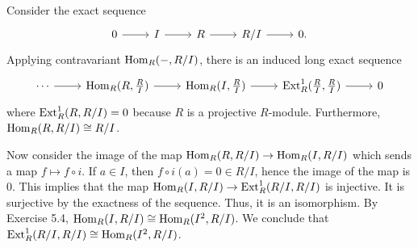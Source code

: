 \documentclass[../../master.tex]{subfiles}
\begin{document}
\begin{solution}
    Consider the exact sequence
    \[
    \begin{tikzcd}
        0 & I & R & R/I & 0.
        \arrow[from=1-1, to=1-2]
        \arrow[from=1-2, to=1-3]
        \arrow[from=1-3, to=1-4]
        \arrow[from=1-4, to=1-5] 
    \end{tikzcd}
    \]
    Applying contravariant $\operatorname{Hom}_R(-, R/I)$, there is an induced long exact sequence
    \[
    \begin{tikzcd}
        \cdots & \Hom_R(R, \frac{R}{I}) & \Hom_R(I, \frac{R}{I}) & \Ext_R^{1}(\frac{R}{I}, \frac{R}{I}) & 0
        \arrow[from=1-1, to=1-2]
        \arrow[from=1-2, to=1-3]
        \arrow[from=1-3, to=1-4]
        \arrow[from=1-4, to=1-5] 
    \end{tikzcd}
    \]
    where $\operatorname{Ext}_R^{1}(R, R/I) = 0$ because $R$ is a projective $R$-module.
    Furthermore, $\operatorname{Hom}_R(R, R/I) \cong R/I$.

    Now consider the image of the map $\operatorname{Hom}_R(R, R/I) \to \operatorname{Hom}_R(I, R/I)$ which sends a map $f \mapsto f \circ i$.
    If $a \in I$, then $f \circ i(a) = 0 \in R/I$, hence the image of the map is 0.
    This implies that the map $\operatorname{Hom}_R(I, R/I) \to \operatorname{Ext}_R^{1}(R/I, R/I)$ is injective.
    It is surjective by the exactness of the sequence.
    Thus, it is an isomorphism.
    By Exercise 5.4, $\operatorname{Hom}_R(I, R/I) \cong \operatorname{Hom}_R(I^2, R/I)$.
    We conclude that $\operatorname{Ext}_R^{1}(R/I, R/I) \cong \operatorname{Hom}_R(I^2, R/I)$.
\end{solution}
\end{document}
